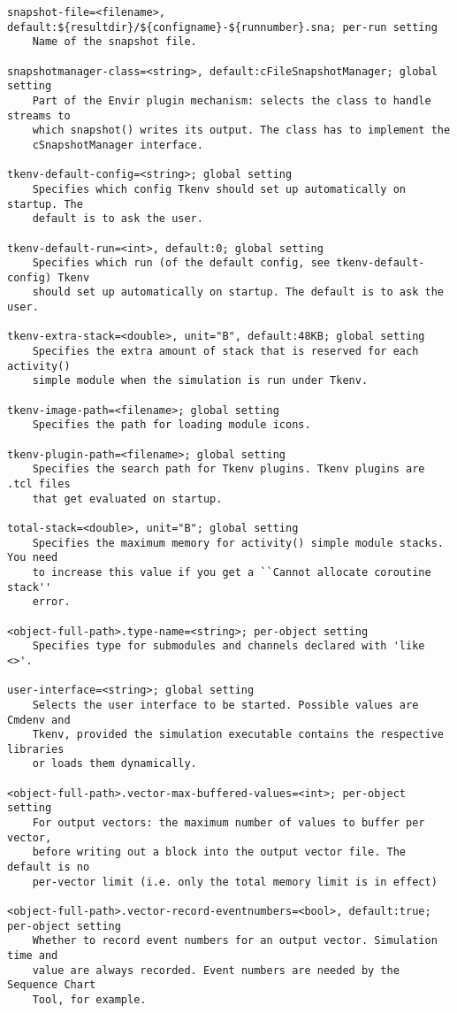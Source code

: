 \begin{verbatim}
snapshot-file=<filename>, default:${resultdir}/${configname}-${runnumber}.sna; per-run setting
    Name of the snapshot file.

snapshotmanager-class=<string>, default:cFileSnapshotManager; global setting
    Part of the Envir plugin mechanism: selects the class to handle streams to
    which snapshot() writes its output. The class has to implement the
    cSnapshotManager interface.

tkenv-default-config=<string>; global setting
    Specifies which config Tkenv should set up automatically on startup. The
    default is to ask the user.

tkenv-default-run=<int>, default:0; global setting
    Specifies which run (of the default config, see tkenv-default-config) Tkenv
    should set up automatically on startup. The default is to ask the user.

tkenv-extra-stack=<double>, unit="B", default:48KB; global setting
    Specifies the extra amount of stack that is reserved for each activity()
    simple module when the simulation is run under Tkenv.

tkenv-image-path=<filename>; global setting
    Specifies the path for loading module icons.

tkenv-plugin-path=<filename>; global setting
    Specifies the search path for Tkenv plugins. Tkenv plugins are .tcl files
    that get evaluated on startup.

total-stack=<double>, unit="B"; global setting
    Specifies the maximum memory for activity() simple module stacks. You need
    to increase this value if you get a ``Cannot allocate coroutine stack''
    error.

<object-full-path>.type-name=<string>; per-object setting
    Specifies type for submodules and channels declared with 'like <>'.

user-interface=<string>; global setting
    Selects the user interface to be started. Possible values are Cmdenv and
    Tkenv, provided the simulation executable contains the respective libraries
    or loads them dynamically.

<object-full-path>.vector-max-buffered-values=<int>; per-object setting
    For output vectors: the maximum number of values to buffer per vector,
    before writing out a block into the output vector file. The default is no
    per-vector limit (i.e. only the total memory limit is in effect)

<object-full-path>.vector-record-eventnumbers=<bool>, default:true; per-object setting
    Whether to record event numbers for an output vector. Simulation time and
    value are always recorded. Event numbers are needed by the Sequence Chart
    Tool, for example.


\end{verbatim}
